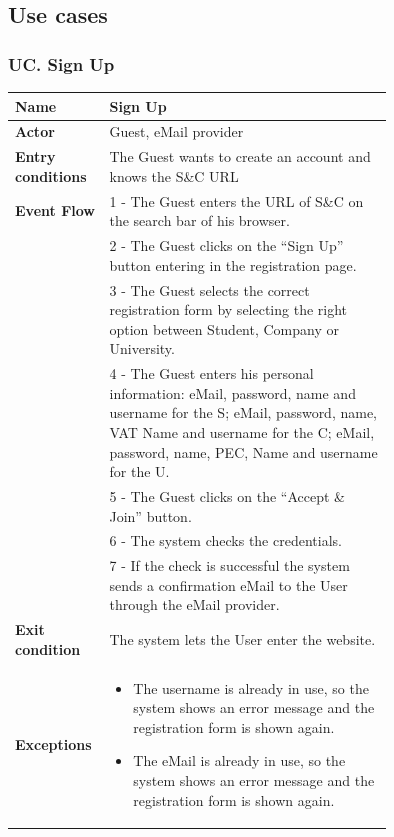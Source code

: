 \subsection{Use cases}
\label{subsec: use_cases}%
\setcounter{uc}{1}
\newcommand{\cuc}{\theuc{}}


\subsubsection*{UC\cuc . Sign Up}
\begin{center}
    \begin{longtable}{|l|p{0.75\linewidth}|}
        \hline
        \textbf{Name}               & Sign Up\\
        \hline
        \textbf{Actor}              & Guest, eMail provider\\
        \hline
        \textbf{Entry conditions}   & The Guest wants to create an account and knows the S\&C URL\\
        \hline
        \textbf{Event Flow}         & 1 - The Guest enters the URL of S\&C on the search bar of his browser.    \\
        & 2 - The Guest clicks on the “Sign Up” button entering in the registration page.    \\
        & 3 - The Guest selects the correct registration form by selecting the right option between Student, Company or University. \\
        & 4 - The Guest enters his personal information: eMail, password, name and username for the S; eMail, password, name, VAT Name and username for the C; eMail, password, name, PEC, Name and username for the U. \\
        & 5 - The Guest clicks on the “Accept \& Join” button.  \\
        & 6 - The system checks the credentials.    \\
        & 7 - If the check is successful the system sends a confirmation eMail to the User through the eMail provider.  \\
        \hline
        \textbf{Exit condition}   & The system lets the User enter the website. \\       
        \hline
        \textbf{Exceptions}       & \begin{itemize}
            \item The username is already in use, so the system shows an error message and the registration form is shown again.
            \item The eMail is already in use, so the system shows an error message and the registration form is shown again.

\end{itemize}
\end{longtable}
\end{center}
